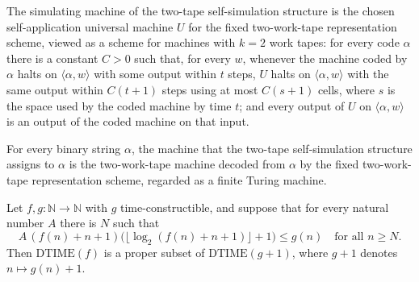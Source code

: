 \begin{theorem}
\label{Complexity.TimeHierarchy.twoTapeSelfSimulator_W}
\leanok
{}
The simulating machine of the two-tape self-simulation structure is the chosen
self-application universal machine $U$ for the fixed two-work-tape representation scheme,
viewed as a scheme for machines with $k=2$ work tapes: for every code $\alpha$ there is a
constant $C>0$ such that, for every $w$, whenever the machine coded by $\alpha$ halts on
$\langle\alpha,w\rangle$ with some output within $t$ steps, $U$ halts on
$\langle\alpha,w\rangle$ with the same output within $C(t+1)$ steps using at most $C(s+1)$
cells, where $s$ is the space used by the coded machine by time $t$; and every output of $U$
on $\langle\alpha,w\rangle$ is an output of the coded machine on that input.
\end{theorem}

\begin{theorem}
\label{Complexity.TimeHierarchy.twoTapeSelfSimulator_decode}
\leanok
{}
For every binary string $\alpha$, the machine that the two-tape self-simulation structure
assigns to $\alpha$ is the two-work-tape machine decoded from $\alpha$ by the fixed
two-work-tape representation scheme, regarded as a finite Turing machine.
\end{theorem}

\begin{theorem}
\label{Complexity.time_hierarchy_log}
\leanok
{}
Let $f,g:\mathbb{N}\to\mathbb{N}$ with $g$ time-constructible, and suppose that for every
natural number $A$ there is $N$ such that
\[A\,(f(n)+n+1)\bigl(\lfloor\log_2(f(n)+n+1)\rfloor+1\bigr) \le g(n)\quad\text{for all } n\ge N.\]
Then $\mathrm{DTIME}(f)$ is a proper subset of $\mathrm{DTIME}(g+1)$, where $g+1$ denotes
$n\mapsto g(n)+1$.
\end{theorem}

